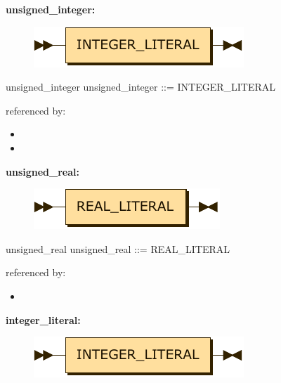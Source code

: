 \documentclass[10pt,a4paper,twoside]{article}
\providecommand{\tightlist}{%
  \setlength{\itemsep}{0pt}\setlength{\parskip}{0pt}}
\newcounter{grammarbox}[section]
\begin{document}
\textbf{unsigned\_integer:}

\begin{figure}[H]
\centering
\includegraphics{diagram/unsigned_integer.pdf}

\end{figure}

\begin{grammarbox}{unsigned\_integer}
\vspace{0.5em}
unsigned\_integer
         ::= INTEGER\_LITERAL
\end{grammarbox}

referenced by:

\begin{itemize}
\tightlist
\item
\item
\end{itemize}

\textbf{unsigned\_real:}

\begin{figure}[H]
\centering
\includegraphics{diagram/unsigned_real.pdf}

\end{figure}

\begin{grammarbox}{unsigned\_real}
\vspace{0.5em}
unsigned\_real
         ::= REAL\_LITERAL
\end{grammarbox}

referenced by:

\begin{itemize}
\tightlist
\item
\end{itemize}

\textbf{integer\_literal:}

\begin{figure}[H]
\centering
\includegraphics{diagram/integer_literal.pdf}

\end{figure}
\end{document}
